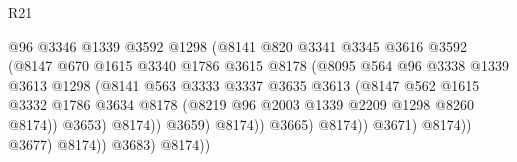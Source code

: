 \begin{lexlean}{R21}
\begin{coremodule}
                                          @96
                                          @3346
                                          @1339
                                          @3592
                                          @1298
                                          (@8141
                                            @820
                                            @3341
                                            @3345
                                            @3616
                                            @3592
                                            (@8147
                                              @670
                                              @1615
                                              @3340
                                              @1786
                                              @3615
                                              @8178
                                              (@8095
                                                @564
                                                @96
                                                @3338
                                                @1339
                                                @3613
                                                @1298
                                                (@8141
                                                  @563
                                                  @3333
                                                  @3337
                                                  @3635
                                                  @3613
                                                  (@8147
                                                    @562
                                                    @1615
                                                    @3332
                                                    @1786
                                                    @3634
                                                    @8178
                                                    (@8219 @96 @2003 @1339 @2209 @1298 @8260 @8174))
                                                  @3653)
                                                @8174))
                                            @3659)
                                          @8174))
                                      @3665)
                                    @8174))
                                @3671)
                              @8174))
                          @3677)
                        @8174))
                    @3683)
                  @8174))

\end{coremodule}
\end{lexlean}
